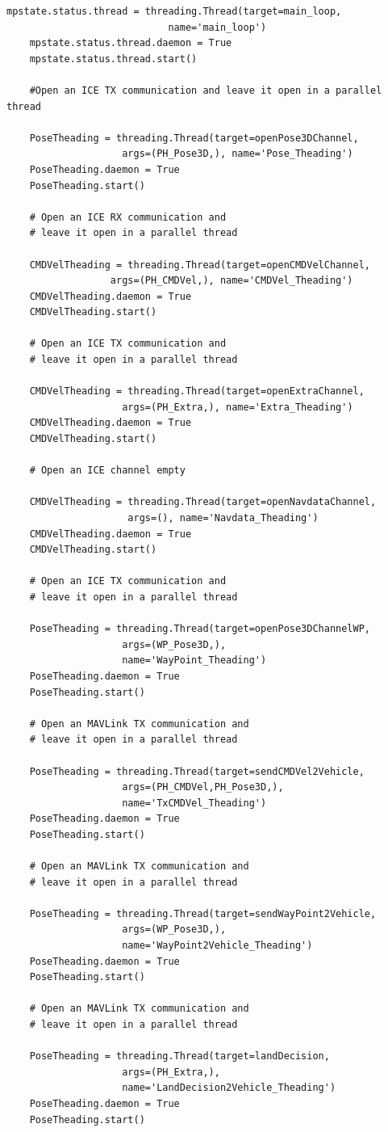 \begin{lstlisting}[frame=single]
    mpstate.status.thread = threading.Thread(target=main_loop, 
    						name='main_loop')
    mpstate.status.thread.daemon = True
    mpstate.status.thread.start()

    #Open an ICE TX communication and leave it open in a parallel thread

    PoseTheading = threading.Thread(target=openPose3DChannel, 
    				args=(PH_Pose3D,), name='Pose_Theading')
    PoseTheading.daemon = True
    PoseTheading.start()

    # Open an ICE RX communication and 
    # leave it open in a parallel thread

    CMDVelTheading = threading.Thread(target=openCMDVelChannel, 
    		      args=(PH_CMDVel,), name='CMDVel_Theading')
    CMDVelTheading.daemon = True
    CMDVelTheading.start()

    # Open an ICE TX communication and 
    # leave it open in a parallel thread

    CMDVelTheading = threading.Thread(target=openExtraChannel, 
    				args=(PH_Extra,), name='Extra_Theading')
    CMDVelTheading.daemon = True
    CMDVelTheading.start()

    # Open an ICE channel empty

    CMDVelTheading = threading.Thread(target=openNavdataChannel, 
    				 args=(), name='Navdata_Theading')
    CMDVelTheading.daemon = True
    CMDVelTheading.start()

    # Open an ICE TX communication and 
    # leave it open in a parallel thread

    PoseTheading = threading.Thread(target=openPose3DChannelWP, 
    				args=(WP_Pose3D,), 
                    name='WayPoint_Theading')
    PoseTheading.daemon = True
    PoseTheading.start()

    # Open an MAVLink TX communication and 
    # leave it open in a parallel thread
  
    PoseTheading = threading.Thread(target=sendCMDVel2Vehicle, 
    				args=(PH_CMDVel,PH_Pose3D,), 
                    name='TxCMDVel_Theading')
    PoseTheading.daemon = True
    PoseTheading.start()

    # Open an MAVLink TX communication and 
    # leave it open in a parallel thread

    PoseTheading = threading.Thread(target=sendWayPoint2Vehicle,
    				args=(WP_Pose3D,), 
                    name='WayPoint2Vehicle_Theading')
    PoseTheading.daemon = True
    PoseTheading.start()

    # Open an MAVLink TX communication and 
    # leave it open in a parallel thread

    PoseTheading = threading.Thread(target=landDecision, 
    				args=(PH_Extra,), 
                    name='LandDecision2Vehicle_Theading')
    PoseTheading.daemon = True
    PoseTheading.start()
   
\end{lstlisting}

